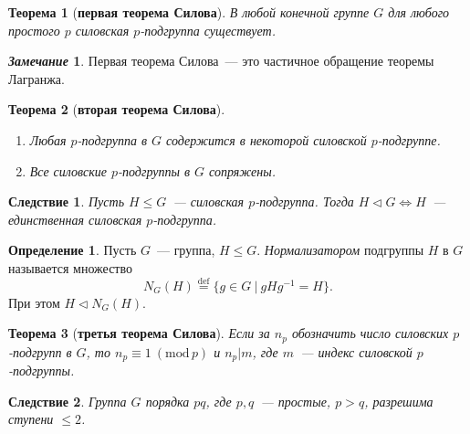 \documentclass[a4paper, 14pt]{extarticle}
\newcommand{\deq}{\stackrel{\mathrm{def}}{=}}
\renewcommand{\mod}{\mathrm{mod} \,}
\theoremstyle{definition}
\newtheorem*{remark}{\textit{Замечание}}
\newtheorem{definition}{Определение}
\theoremstyle{plain}
\newtheorem*{theorem*}{Теорема}
\numberwithin{theorem}{section}
\numberwithin{definition}{section}
\numberwithin{statement}{section}
\numberwithin{lemma}{section}
\newtheorem*{consequence*}{Следствие}
\numberwithin{consequence}{section}
\begin{document}
        \begin{theorem*}[\textbf{первая теорема Силова}]
            В любой конечной группе $G$ для любого простого $p$ силовская $p$-подгруппа существует. 
        \end{theorem*}
        \begin{remark}
            Первая теорема Силова~--- это частичное обращение теоремы Лагранжа.
        \end{remark}
        \begin{theorem*}[\textbf{вторая теорема Силова}]
            \
            \begin{enumerate}
            \setlength\itemsep{0.1em}
                \item Любая $p$-подгруппа в $G$ содержится в некоторой силовской $p$-подгруппе. 
                \item Все силовские $p$-подгруппы в $G$ сопряжены.
            \end{enumerate}
        \end{theorem*}
        \begin{consequence*}
            Пусть ${H \leqslant G}$~--- силовская $p$-подгруппа. Тогда ${H \lhd G \Leftrightarrow H}$~--- единственная силовская $p$-подгруппа.
        \end{consequence*}
        \begin{definition}
            Пусть $G$~--- группа, ${H \leqslant G.}$ \textit{Нормализатором} подгруппы $H$ в $G$ называется множество
            \begin{equation*}
                N_G(H) \deq \{g \in G \ | \ gHg^{-1} = H\}.
            \end{equation*}
            При этом ${H \lhd N_G(H).}$
        \end{definition}
        \begin{theorem*}[\textbf{третья теорема Силова}]
             Если за $n_p$ обозначить число силовских $p$-подгрупп в $G$, то $n_p \equiv 1 \ (\mod p)$ и $n_p|m$, где $m$~--- индекс силовской $p$-подгруппы. 
        \end{theorem*}
        \begin{consequence*}
             Группа $G$ порядка $pq$, где $p,q$~--- простые, ${p > q}$, разрешима ступени $\leqslant2$.
        \end{consequence*}
        \newpage
\end{document}
